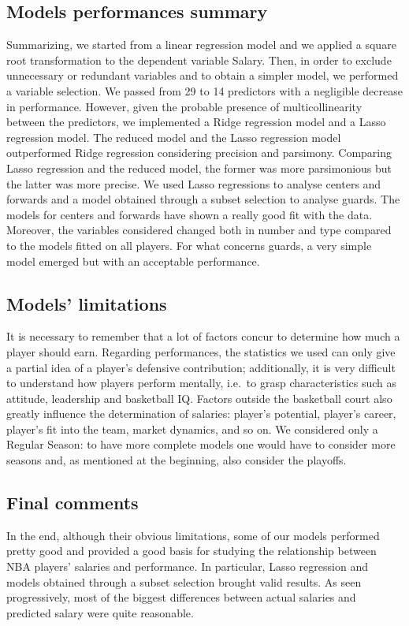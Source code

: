 \documentclass[
]{article}
\begin{document}
\hypertarget{models-performances-summary}{%
\subsection{Models performances
summary}\label{models-performances-summary}}

Summarizing, we started from a linear regression model and we applied a
square root transformation to the dependent variable Salary. Then, in
order to exclude unnecessary or redundant variables and to obtain a
simpler model, we performed a variable selection. We passed from 29 to
14 predictors with a negligible decrease in performance. However, given
the probable presence of multicollinearity between the predictors, we
implemented a Ridge regression model and a Lasso regression model. The
reduced model and the Lasso regression model outperformed Ridge
regression considering precision and parsimony. Comparing Lasso
regression and the reduced model, the former was more parsimonious but
the latter was more precise. We used Lasso regressions to analyse
centers and forwards and a model obtained through a subset selection to
analyse guards. The models for centers and forwards have shown a really
good fit with the data. Moreover, the variables considered changed both
in number and type compared to the models fitted on all players. For
what concerns guards, a very simple model emerged but with an acceptable
performance.

\hypertarget{models-limitations}{%
\subsection{Models' limitations}\label{models-limitations}}

It is necessary to remember that a lot of factors concur to determine
how much a player should earn. Regarding performances, the statistics we
used can only give a partial idea of a player's defensive contribution;
additionally, it is very difficult to understand how players perform
mentally, i.e.~to grasp characteristics such as attitude, leadership and
basketball IQ. Factors outside the basketball court also greatly
influence the determination of salaries: player's potential, player's
career, player's fit into the team, market dynamics, and so on. We
considered only a Regular Season: to have more complete models one would
have to consider more seasons and, as mentioned at the beginning, also
consider the playoffs.

\hypertarget{final-comments}{%
\subsection{Final comments}\label{final-comments}}

In the end, although their obvious limitations, some of our models
performed pretty good and provided a good basis for studying the
relationship between NBA players' salaries and performance. In
particular, Lasso regression and models obtained through a subset
selection brought valid results. As seen progressively, most of the
biggest differences between actual salaries and predicted salary were
quite reasonable.
\end{document}
